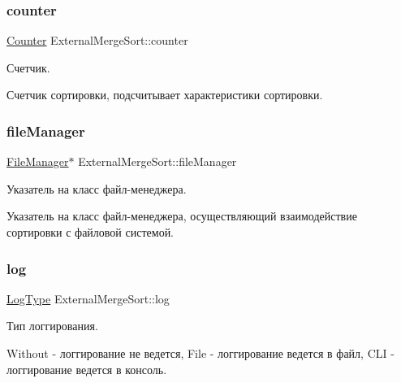 \subsubsection{\texorpdfstring{counter}{counter}}
{\footnotesize\ttfamily \hyperlink{class_counter}{Counter} External\+Merge\+Sort\+::counter}



Счетчик. 

Счетчик сортировки, подсчитывает характеристики сортировки. \hypertarget{class_external_merge_sort_ab82d3b62a57be6c80dbd12b90de278e2}{}\label{class_external_merge_sort_ab82d3b62a57be6c80dbd12b90de278e2} 
\subsubsection{\texorpdfstring{file\+Manager}{fileManager}}
{\footnotesize\ttfamily \hyperlink{class_file_manager}{File\+Manager}$\ast$ External\+Merge\+Sort\+::file\+Manager\hspace{0.3cm}{\ttfamily [private]}}



Указатель на класс файл-\/менеджера. 

Указатель на класс файл-\/менеджера, осуществляющий взаимодействие сортировки с файловой системой. \hypertarget{class_external_merge_sort_a41f61c3beb7dc529d7f2a8b2b4ee380b}{}\label{class_external_merge_sort_a41f61c3beb7dc529d7f2a8b2b4ee380b} 
\subsubsection{\texorpdfstring{log}{log}}
{\footnotesize\ttfamily \hyperlink{_structures_8h_af67907baa897e9fb84df0cb89795b87c}{Log\+Type} External\+Merge\+Sort\+::log\hspace{0.3cm}{\ttfamily [private]}}



Тип логгирования. 

Without -\/ логгирование не ведется, File -\/ логгирование ведется в файл, C\+LI -\/ логгирование ведется в консоль. \hypertarget{class_external_merge_sort_a4b050cd230e144a11f65e57523e15ce6}{}\label{class_external_merge_sort_a4b050cd230e144a11f65e57523e15ce6} 

